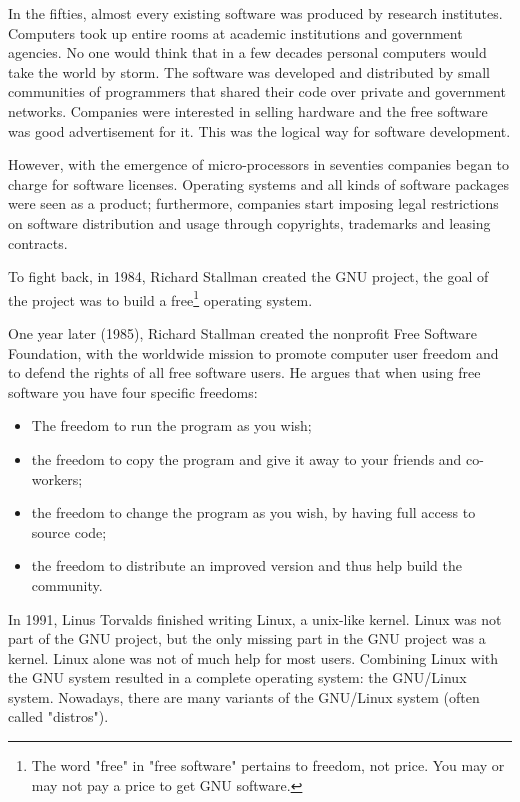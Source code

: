 In the fifties, almost every existing software was produced by research institutes. 
Computers took up entire rooms at academic institutions and government agencies.
No one would think that in a few decades personal computers would take the world by storm.
The software was developed and distributed by small communities of
programmers that shared their code over private and government networks.
Companies were interested in selling hardware and the free software was good advertisement for it.
This was the logical way for software development.

However, with the emergence of micro-processors in seventies companies began to charge for software licenses.
Operating systems and all kinds of software packages were seen as a product; 
furthermore, companies start imposing legal restrictions on software distribution and usage through copyrights, 
trademarks and leasing contracts.

To fight back, in 1984, Richard Stallman created the GNU project, the goal of the project was to build a 
\textsf{free}\footnote{
  The word "free" in "free software" pertains to freedom, not price. You may or may not pay a price to get GNU software.
}
operating system. 

One year later (1985), Richard Stallman created the nonprofit Free Software Foundation, with the worldwide mission to promote computer user freedom and to defend the rights of all free software users.
He argues that when using free software you have four specific freedoms:
\begin{itemize}
\item The freedom to run the program as you wish; 
\item the freedom to copy the program and give it away to your friends and co-workers; 
\item the freedom to change the program as you wish, by having full access to source code; 
\item the freedom to distribute an improved version and thus help build the community.
\end{itemize}
In 1991, Linus Torvalds finished writing Linux, a unix-like kernel.
Linux was not part of the GNU project, but the only missing part in the GNU project was a kernel.
Linux alone was not of much help for most users.
Combining Linux with the GNU system resulted in a complete operating system: the GNU/Linux system.
Nowadays, there are many variants of the GNU/Linux system (often called "distros").

